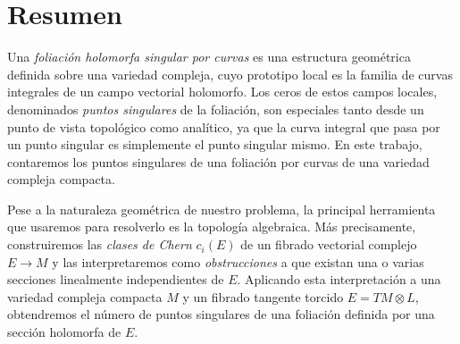 \chapter*{Resumen}

Una \textit{foliación holomorfa singular por curvas} es una estructura geométrica definida sobre una variedad compleja, cuyo prototipo local es la familia de curvas integrales de un campo vectorial holomorfo. Los ceros de estos campos locales, denominados \textit{puntos singulares} de la foliación, son especiales tanto desde un punto de vista topológico como analítico, ya que la curva integral que pasa por un punto singular es simplemente el punto singular mismo. En este trabajo, contaremos los puntos singulares de una foliación por curvas de una variedad compleja compacta.

Pese a la naturaleza geométrica de nuestro problema, la principal herramienta que usaremos para resolverlo es la topología algebraica. Más precisamente, construiremos las \textit{clases de Chern} $c_i(E)$ de un fibrado vectorial complejo $E \to M$ y las interpretaremos como \textit{obstrucciones} a que existan una o varias secciones linealmente independientes de $E$. Aplicando esta interpretación a una variedad compleja compacta $M$ y un fibrado tangente torcido $E = TM \otimes L$, obtendremos el número de puntos singulares de una foliación definida por una sección holomorfa de $E$.